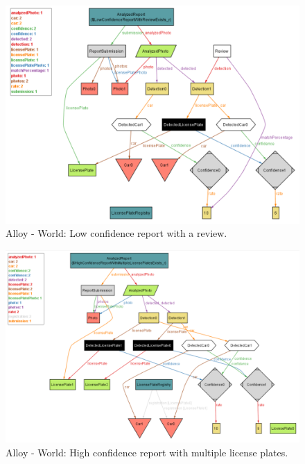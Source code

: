 \begin{figure}[H]
    \centering
    \includegraphics[width=\textwidth]{Images/alloy/9.png}
    \caption{\label{fig:alloy}Alloy - World: Low confidence report with a review.}
\end{figure}

\begin{figure}[H]
    \centering
    \includegraphics[width=\textwidth]{Images/alloy/10.png}
    \caption{\label{fig:alloy}Alloy - World: High confidence report with multiple license plates.}
\end{figure}


